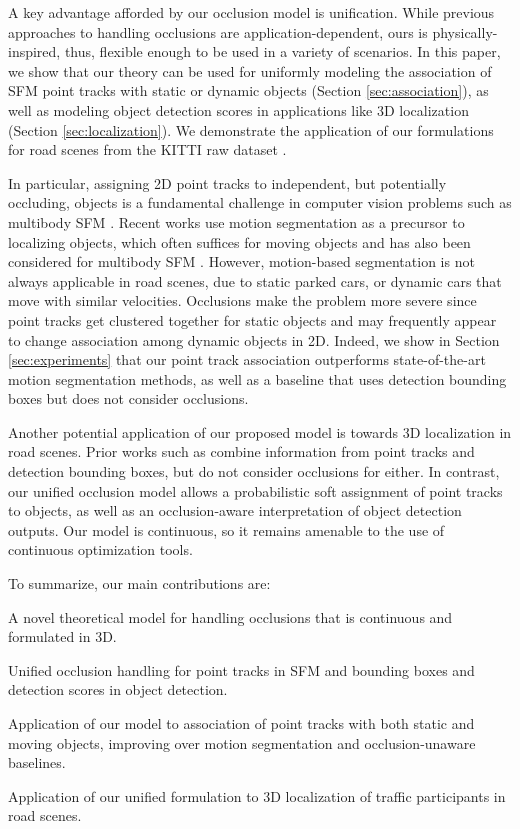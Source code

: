 A key advantage afforded by our occlusion model is unification. While previous approaches to handling occlusions are application-dependent, ours is physically-inspired, thus, flexible enough to be used in a variety of scenarios. In this paper, we show that our theory can be used for uniformly modeling the association of SFM point tracks with static or dynamic objects (Section \ref{sec:association}), as well as modeling object detection scores in applications like 3D localization (Section \ref{sec:localization}). We demonstrate the application of our formulations for road scenes from the KITTI raw dataset \cite{Geiger_etal_2012}.


In particular, assigning 2D point tracks to independent, but potentially occluding, objects is a fundamental challenge in computer vision problems such as multibody SFM \cite{Ozden_etal_2010}. Recent works use motion segmentation \cite{Brox_Malik_2010,Rao_etal_2010} as a precursor to localizing objects, which often suffices for moving objects \cite{Tron_Vidal_2007} and has also been considered for multibody SFM \cite{Kundu_etal_2011}. However, motion-based segmentation is not always applicable in road scenes, due to static parked cars, or dynamic cars that move with similar velocities. Occlusions make the problem more severe since point tracks get clustered together for static objects and may frequently appear to change association among dynamic objects in 2D.
Indeed, we show in Section \ref{sec:experiments} that our point track association outperforms state-of-the-art motion segmentation methods, as well as a baseline that uses detection bounding boxes but does not consider occlusions.

Another potential application of our proposed model is towards 3D localization in road scenes. Prior works such as \cite{Song_Chandraker_2015} combine information from point tracks and detection bounding boxes, but do not consider occlusions for either. In contrast, our unified occlusion model allows a probabilistic soft assignment of point tracks to objects, as well as an occlusion-aware interpretation of object detection outputs. Our model is continuous, so it remains amenable to the use of continuous optimization tools.

To summarize, our main contributions are:
\vspace{-0.2cm}
\begin{tight_itemize}
\item A novel theoretical model for handling occlusions that is continuous and formulated in 3D.
\item Unified occlusion handling for point tracks in SFM and bounding boxes and detection scores in object detection.
\item Application of our model to association of point tracks with both static and moving objects, improving over motion segmentation and occlusion-unaware baselines.
\item Application of our unified formulation to 3D localization of traffic participants in road scenes.
\end{tight_itemize}



